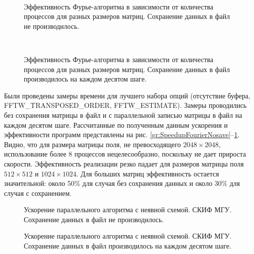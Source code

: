 	\begin{figure}[h!]
		\begin{center}
			\begin{minipage}{0.45\linewidth}
				 \\
                \caption{Эффективность Фурье-алгоритма в зависимости от количества процессов для разных размеров матриц. Сохранение данных в файл не производилось.}
                \label{gr:EfficiencyFourierNosave}
			\end{minipage}
			\hfill
			\begin{minipage}{0.45\linewidth}
				 \\
                \caption{Эффективность Фурье-алгоритма в зависимости от количества процессов для разных размеров матриц. Сохранение данных в файл производилось на каждом десятом шаге.}
                \label{gr:EfficiencyFourierSave}
			\end{minipage}
		\end{center}
	\end{figure}

Были проведены замеры времени для лучшего набора опций (отсутствие буфера, FFTW\_TRANSPOSED\_ORDER, FFTW\_ESTIMATE).
Замеры проводились без сохранения матрицы в файл и с параллельной записью матрицы в файл на каждом десятом шаге.
Рассчитанные по полученным данным ускорения и эффективности программ представлены на рис. \ref{gr:SpeedupFourierNosave}--\ref{gr:EfficiencyFourierSave}.
Видно, что для размера матрицы поля, не превосходящего $2048\times2048$, использование более 8 процессов нецелесообразно, поскольку не дает прироста скорости.
Эффективность реализации резко падает для размеров матрицы поля $512\times512$ и $1024\times1024$. 
Для больших матриц эффективность остается значительной: около 50\% для случая без сохранения данных и около 30\% для случая с сохранением.
    \begin{figure}[h!]
        \begin{center}
            \begin{minipage}{0.45\linewidth}
                \caption{Ускорение параллельного алгоритма с неявной схемой. СКИФ МГУ. Сохранение данных в файл не производилось.}
                \label{gr:SweepSpeedupSkifNosave}
			\end{minipage}
			\hfill
			\begin{minipage}{0.45\linewidth}
                \caption{Ускорение параллельного алгоритма с неявной схемой. СКИФ МГУ. Сохранение данных в файл производилось на каждом десятом шаге.}
                \label{gr:SweepSpeedupSkifSave}
			\end{minipage}
		\end{center}
	\end{figure}

